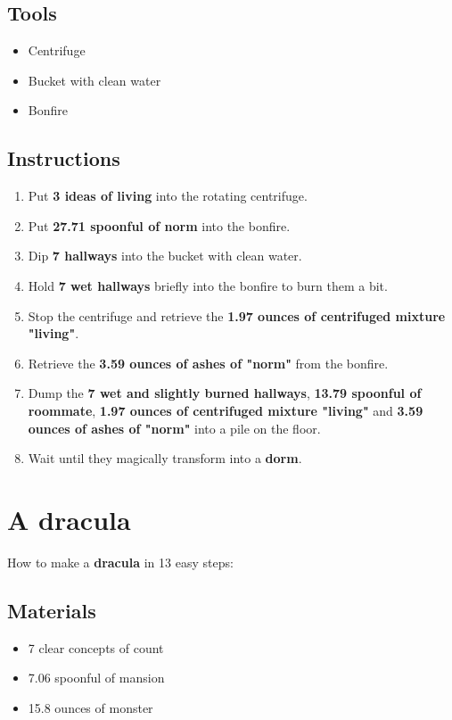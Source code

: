 \documentclass{article}
\begin{document}
\subsection{Tools}\begin{itemize}
\item 
Centrifuge
\item 
Bucket with clean water
\item 
Bonfire
\end{itemize}
\subsection{Instructions}\begin{enumerate}
\item 
Put \textbf{3 ideas of living} into the rotating centrifuge.
\item 
Put \textbf{27.71 spoonful of norm} into the bonfire.
\item 
Dip \textbf{7 hallways} into the bucket with clean water.
\item 
Hold \textbf{7 wet hallways} briefly into the bonfire to burn them a bit.
\item 
Stop the centrifuge and retrieve the \textbf{1.97 ounces of centrifuged mixture "living"}.
\item 
Retrieve the \textbf{3.59 ounces of ashes of "norm"} from the bonfire.
\item 
Dump the \textbf{7 wet and slightly burned hallways}, \textbf{13.79 spoonful of roommate}, \textbf{1.97 ounces of centrifuged mixture "living"} and \textbf{3.59 ounces of ashes of "norm"} into a pile on the floor.
\item 
Wait until they magically transform into a \textbf{dorm}.
\end{enumerate}
\newpage
\section{A dracula}How to make a \textbf{dracula} in 13 easy steps:

\subsection{Materials}\begin{itemize}
\item 
7 clear concepts of count
\item 
7.06 spoonful of mansion
\item 
15.8 ounces of monster
\end{itemize}
\end{document}

